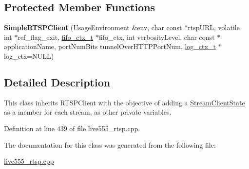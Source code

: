 \subsection*{Protected Member Functions}
\begin{DoxyCompactItemize}
\item 
{\bfseries Simple\+R\+T\+S\+P\+Client} (Usage\+Environment \&env, char const $\ast$rtsp\+U\+RL, volatile int $\ast$ref\+\_\+flag\+\_\+exit, \hyperlink{structfifo__ctx__s}{fifo\+\_\+ctx\+\_\+t} $\ast$fifo\+\_\+ctx, int verbosity\+Level, char const $\ast$application\+Name, port\+Num\+Bits tunnel\+Over\+H\+T\+T\+P\+Port\+Num, \hyperlink{structlog__ctx__s}{log\+\_\+ctx\+\_\+t} $\ast$log\+\_\+ctx=N\+U\+LL)\hypertarget{classSimpleRTSPClient_acc028f7094149456d884b347f720b663}{}\label{classSimpleRTSPClient_acc028f7094149456d884b347f720b663}

\end{DoxyCompactItemize}


\subsection{Detailed Description}
This class inherits R\+T\+S\+P\+Client with the objective of adding a \hyperlink{classStreamClientState}{Stream\+Client\+State} as a member for each stream, as other private variables. 

Definition at line 439 of file live555\+\_\+rtsp.\+cpp.



The documentation for this class was generated from the following file\+:\begin{DoxyCompactItemize}
\item 
\hyperlink{live555__rtsp_8cpp}{live555\+\_\+rtsp.\+cpp}\end{DoxyCompactItemize}
